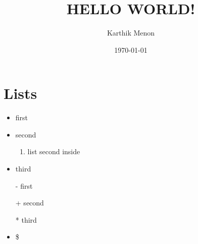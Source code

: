 \documentclass[a4paper,12pt]{article}
\begin{document}
\title{HELLO WORLD!}
\author{Karthik Menon}
\date{\today}
\maketitle
\newpage
\newpage
\section{Lists}
\begin{itemize}
	\item first
	\item second
	\begin{enumerate}
		\item list second inside
	\end{enumerate}
	\item third
\end{itemize}
\begin{itemize}
	\item[-] first
	\item[+] second
	\item[*] third
	\item \$
\end{itemize}
\end{document}
